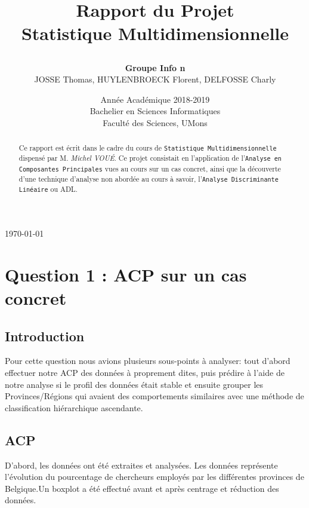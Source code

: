 \documentclass{article}
\begin{document}
\title{
{\Huge Rapport du Projet\\
Statistique Multidimensionnelle\\
\smallskip
\author{
\textbf{Groupe Info n}\\
JOSSE Thomas, HUYLENBROECK Florent, DELFOSSE Charly\\
}}
}
\date{Année Académique  2018-2019\\
 Bachelier en Sciences Informatiques
\\
\vspace{1cm}
Faculté des Sciences, UMons}



\maketitle            %
\bigskip
\begin{center} \today \end{center}
\begin{abstract}
Ce rapport est écrit dans le cadre du cours de \texttt{Statistique Multidimensionnelle} dispensé par M. \emph{Michel VOUÉ}. Ce projet consistait en l'application de l'\texttt{Analyse en Composantes Principales} vues au cours sur un cas concret, ainsi que la découverte d'une technique d'analyse non abordée au cours à savoir, l'\texttt{Analyse Discriminante Linéaire} ou ADL.
\end{abstract}
\newpage
\tableofcontents
\newpage
\section{Question 1 : ACP sur un cas concret}
\subsection{Introduction}
Pour cette question nous avions plusieurs sous-points à analyser: tout d'abord effectuer notre ACP des données à proprement dites, puis prédire à l'aide de notre analyse si le profil des données était stable et ensuite grouper les Provinces/Régions qui avaient des comportements similaires avec une méthode de classification hiérarchique ascendante. 

\subsection{ACP}
D'abord, les données ont été extraites et analysées. Les données représente l'évolution du pourcentage de chercheurs employés par les différentes provinces de Belgique.Un boxplot a été effectué avant et après centrage et réduction des données.
\end{document}
